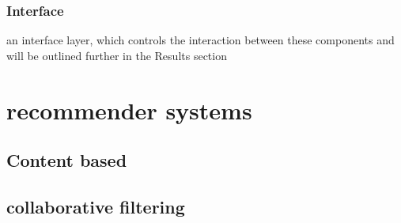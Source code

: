 \subsubsection{Interface}
an interface layer, which controls the interaction between these components and will be outlined further in the Results section


\section{recommender systems}
\subsection{Content based}
\subsection{collaborative filtering}


